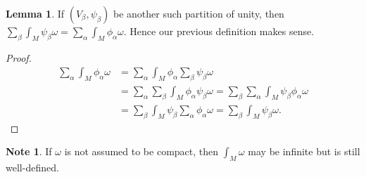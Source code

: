 \documentclass[10pt,letterpaper,cm]{nupset}
\theoremstyle{definition}
\newtheorem{lemma}{Lemma}
\newtheorem*{note}{Note}
\newcommand{\1}{\mathbf{1}}
\newcommand{\0}{\vec 0}
\begin{document}
\begin{lemma}
If $(V_{\beta}, \psi_{\beta})$ be another such partition of unity, then $\sum_{\beta}\int_M\psi_{\beta} \omega = \sum_{\alpha}  \int_M \phi_{\alpha} \omega$. Hence our previous definition makes sense.
\end{lemma}
\begin{proof}
\begin{align*}
 \sum_{\alpha}  \int_M \phi_{\alpha} \omega
& =  \sum_{\alpha}  \int_M \phi_{\alpha} \sum_{\beta} \psi_{\beta} \omega
\\ & = \sum_{\alpha} \sum_{\beta} \int_M \phi_{\alpha} \psi_{\beta} \omega
 = \sum_{\beta} \sum_{\alpha} \int_M \psi_{\beta} \phi_{\alpha} \omega
\\ & = \sum_{\beta}  \int_M \psi_{\beta} \sum_{\alpha} \phi_{\alpha} \omega
 = \sum_{\beta}\int_M\psi_{\beta} \omega. 
\end{align*}
\end{proof}

\begin{note}
If $\omega$ is not assumed to be compact, then $\int_M \omega$ may be infinite but is still well-defined.
\end{note}
\end{document}
